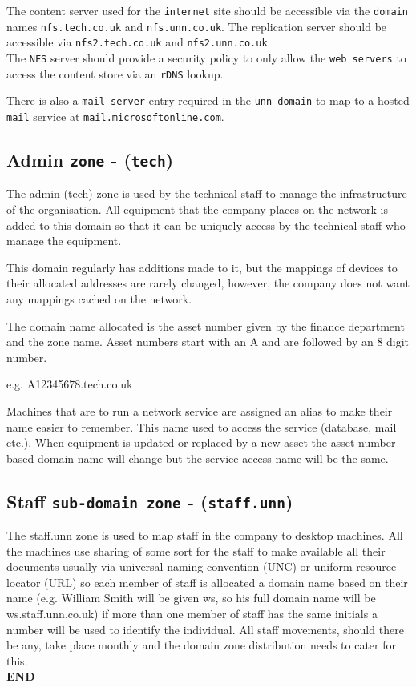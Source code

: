 \documentclass[11pt]{article}
\begin{document}
\noindent The content server used for the \texttt{internet} site should be accessible via the \texttt{domain} names \texttt{nfs.tech.co.uk} and 
\texttt{nfs.unn.co.uk}. The replication server should be accessible via \texttt{nfs2.tech.co.uk} and \texttt{nfs2.unn.co.uk}.\\

\noindent The \texttt{NFS} server should provide a security policy to only allow the \texttt{web servers} to access the content store via an \texttt{rDNS} lookup.

\noindent There is also a \texttt{mail server} entry required in the \texttt{unn domain} to map to a hosted \texttt{mail} service at \texttt{mail.microsoftonline.com}. 

\subsection{Admin \texttt{zone} - (\texttt{tech})}

The admin (tech) zone is used by the technical staff to manage the infrastructure of the organisation. All equipment that the company places on the network is added to this domain so that it can be uniquely access by the technical staff who manage the equipment.

This domain regularly has additions made to it, but the mappings of devices to their allocated addresses are rarely changed, however, the company does not want any mappings cached on the network.

The domain name allocated is the asset number given by the finance department and the zone name. Asset numbers start with an A and are followed by an 8 digit number.

e.g. A12345678.tech.co.uk

Machines that are to run a network service are assigned an alias to make their name easier to remember. This name used to access the service (database, mail etc.). When equipment is updated or replaced by a new asset the asset number-based domain name will change but the service access name will be the same.

\subsection{Staff \texttt{sub-domain zone} - (\texttt{staff.unn})}

The staff.unn zone is used to map staff in the company to desktop machines. All the machines use sharing of some sort for the staff to make available all their documents usually via universal naming convention (UNC) or uniform resource locator (URL) so each member of staff is allocated a domain name based on their name (e.g. William Smith will be given ws, so his full domain name will be ws.staff.unn.co.uk) if more than one member of staff has the same initials a number will be used to identify the individual. All staff movements, should there be any, take place monthly and the domain zone distribution needs to cater for this.\\

\noindent \textbf{END}
\end{document}
